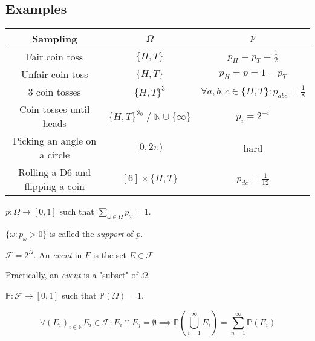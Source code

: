 \documentclass[00_complete]{subfiles}
\begin{document}
\subsection{Examples}
\begin{table}[ht!]
\centering
{\renewcommand{\arraystretch}{1.2}%
\begin{tabular}{ c|c|c }
    Sampling & $\Omega$ & $p$\\
    \hline
    Fair coin toss &  $\{H,T\}$ & $p_H=p_T=\frac{1}{2}$\\
    Unfair coin toss &  $\{H,T\}$ & $p_H=p=1-p_T$\\
    3 coin tosses & $\{H,T\}^3$ & $\forall a,b,c \in \{H,T\}:p_{abc}=\frac{1}{8}$\\
    Coin tosses until heads &$\{H,T\}^{\aleph_0}\;\slash\;\mathbb{N}\cup\{\infty\}$& $p_i=2^{-i}$\\
    Picking an angle on a circle &  $[0,2\pi)$&hard\\
    Rolling a D6 and flipping a coin &  $[6]\times\{H,T\}$&$p_{dc}=\frac{1}{12}$\\
\end{tabular}}
\end{table}
\begin{definition}
    $p:\Omega\to[0,1]$ such that $\sum\limits_{\omega\in\Omega} p_\omega=1$.

    $\{\omega: p_\omega>0\}$ is called the \emph{support} of $p$.
\end{definition}
\begin{definition}[Event]
    $\mathcal F = 2^\Omega$. An \emph{event} in $F$ is the set $E \in \mathcal F$

    Practically, an \emph{event} is a "subset" of $\Omega$.
\end{definition}
\begin{definition}
    $\mathbb{P}:\mathcal F \to [0,1]$ such that $\mathbb{P}(\Omega)=1$.

    $$\forall(E_i)_{i \in \mathbb{N}}E_i \in \mathcal F: E_i\cap E_j = \emptyset
    \implies \mathbb{P}\left(\bigcup_{i=1}^\infty E_i\right) =
    \sum_{n=1}^{\infty}\mathbb{P}(E_i)$$
\end{definition}
\end{document}
